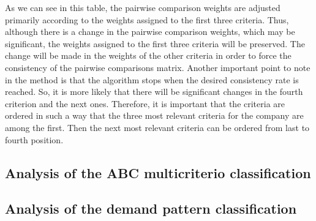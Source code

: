 \documentclass[authoryear,manuscript,12pt]{elsarticle}
\begin{document}
As we can see in this table, the pairwise comparison weights are adjusted primarily according to the  weights assigned to the first three criteria. Thus, although there is a change in the pairwise comparison weights, which may be significant, the weights assigned to the first three criteria will be preserved. The change will be made in the weights of the other criteria in order to force the consistency of the pairwise comparisons matrix. Another important point to note in the method is that the algorithm stops when the desired consistency rate is reached. So, it is more likely that there will be significant changes in the fourth criterion and the next ones. Therefore, it is important that the criteria are ordered in such a way that the three most relevant criteria for the company are among the first. Then the next most relevant criteria can be ordered from last to fourth position.

\subsection{Analysis of the ABC multicriterio classification}

\subsection{Analysis of the demand pattern classification}
\end{document}
